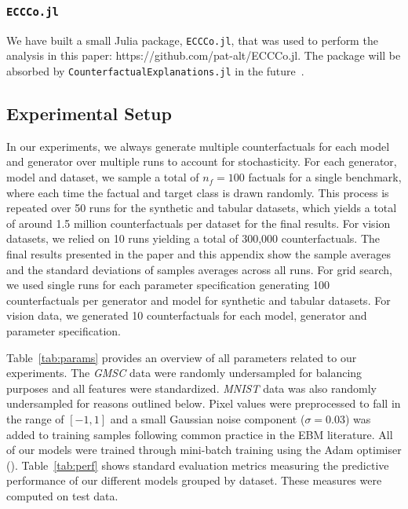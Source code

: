 \subsubsection{\texttt{ECCCo.jl}}

We have built a small Julia package, \texttt{ECCCo.jl}, that was used to perform the analysis in this paper: https://github.com/pat-alt/ECCCo.jl. The package will be absorbed by \texttt{CounterfactualExplanations.jl} in the future~\citep{altmeyer2023explaining}.

\subsection{Experimental Setup}\label{app:setup}

In our experiments, we always generate multiple counterfactuals for each model and generator over multiple runs to account for stochasticity. For each generator, model and dataset, we sample a total of $n_f=100$ factuals for a single benchmark, where each time the factual and target class is drawn randomly. This process is repeated over 50 runs for the synthetic and tabular datasets, which yields a total of around 1.5 million counterfactuals per dataset for the final results. For vision datasets, we relied on 10 runs yielding a total of 300,000 counterfactuals. The final results presented in the paper and this appendix show the sample averages and the standard deviations of samples averages across all runs. For grid search, we used single runs for each parameter specification generating 100 counterfactuals per generator and model for synthetic and tabular datasets. For vision data, we generated 10 counterfactuals for each model, generator and parameter specification.

Table~\ref{tab:params} provides an overview of all parameters related to our experiments. The \textit{GMSC} data were randomly undersampled for balancing purposes and all features were standardized. \textit{MNIST} data was also randomly undersampled for reasons outlined below. Pixel values were preprocessed to fall in the range of $[-1,1]$ and a small Gaussian noise component ($\sigma=0.03$) was added to training samples following common practice in the EBM literature. All of our models were trained through mini-batch training using the Adam optimiser (\citet{kingma2014adam}). Table~\ref{tab:perf} shows standard evaluation metrics measuring the predictive performance of our different models grouped by dataset. These measures were computed on test data. 

